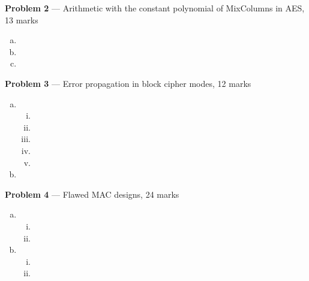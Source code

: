 \documentclass[11pt]{article}
\theoremstyle{definition}
\begin{document}
\newpage

\item[] \textbf{Problem 2} --- Arithmetic with the constant polynomial of MixColumns in AES, 13 marks

\begin{enumerate}[a. ]
  \item
  \item
    \begin{enumerate}[i. ]
    \end{enumerate}

  \item
    \begin{enumerate}[i. ]
    \end{enumerate}
\end{enumerate}

\newpage

\item[] \textbf{Problem 3} --- Error propagation in block cipher modes, 12 marks

\begin{enumerate}[a. ]
  \item
    \begin{enumerate}[i. ]
      \item
      \item
      \item
      \item
      \item
    \end{enumerate}

  \item
    \begin{enumerate}[i. ]
    \end{enumerate}

\end{enumerate}

\newpage

\item[] \textbf{Problem 4} --- Flawed MAC designs, 24 marks

\begin{enumerate}[a. ]
  \item
    \begin{enumerate}[i. ]
      \item

      \item
    \end{enumerate}

  \item
    \begin{enumerate}[i. ]
      \item

      \item
    \end{enumerate}
\end{enumerate}
\end{document}

